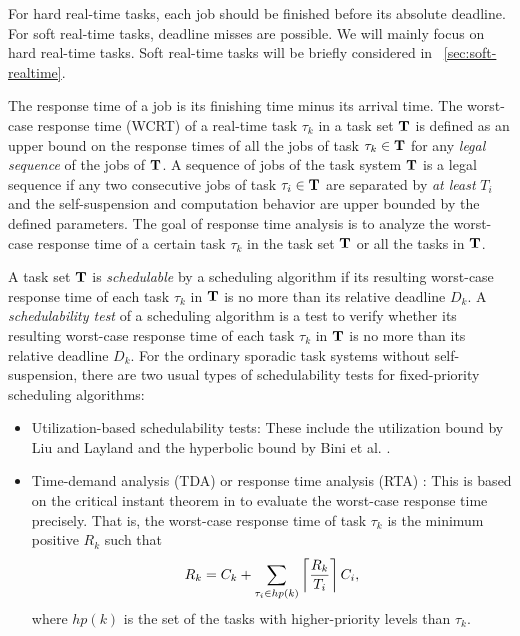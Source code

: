 For hard real-time tasks, each job should be finished before its
absolute deadline. For soft real-time tasks, deadline misses are
possible. We will mainly focus on hard real-time tasks. 
Soft real-time tasks will be briefly considered in
\mysectionref{}~\ref{sec:soft-realtime}.

The response time of a job is its finishing time minus its arrival
time.  The worst-case response time (WCRT) of a real-time task
$\tau_k$ in a task set ${\bf T}$ is defined as an upper bound on the
response times of all the jobs of task $\tau_k \in {\bf T}$ for any
\emph{legal sequence} of the jobs of ${\bf T}$. A sequence of jobs of
the task system ${\bf T}$ is a legal sequence if any two consecutive
jobs of task $\tau_i \in {\bf T}$ are separated by \emph{at least}
$T_i$ and the self-suspension and computation behavior are upper
bounded by the defined parameters. The goal of response time analysis is to
analyze the worst-case response time of a certain task $\tau_k$ in the
task set ${\bf T}$ or all the tasks in ${\bf T}$.

A task set ${\bf T}$ is \emph{schedulable} by a scheduling algorithm if its resulting worst-case response time of each task 
$\tau_k$ in ${\bf T}$ is no more than its relative deadline $D_k$.
A \emph{schedulability test} of a scheduling algorithm is a test to
verify whether its resulting worst-case response time of each task
$\tau_k$ in ${\bf T}$ is no more than its relative deadline $D_k$. For
the ordinary sporadic task systems without self-suspension, there are
two usual types of schedulability tests for fixed-priority scheduling
algorithms:
\begin{itemize}
\item Utilization-based schedulability tests: These include the
  utilization bound by Liu and Layland \cite{Liu_1973}  and the
  hyperbolic bound by Bini et al. \cite{bini2003rate}.
\item Time-demand analysis (TDA) or response time analysis (RTA) \cite{lehoczky-1989}: This is based on the critical instant
  theorem in
  \cite{Liu_1973} to evaluate the worst-case response time
  precisely. That is, the worst-case response time of task $\tau_k$ is
  the minimum positive $R_k$ such that
  \begin{equation}
   \label{eq:rta}
  R_k = C_k+ \sum_{\tau_i \in hp(k)}\left\lceil{\frac{R_k}{T_i}}\right\rceil C_i,     
  \end{equation}
  where $hp(k)$ is the set of the tasks with higher-priority levels
  than $\tau_k$.  
\end{itemize}


